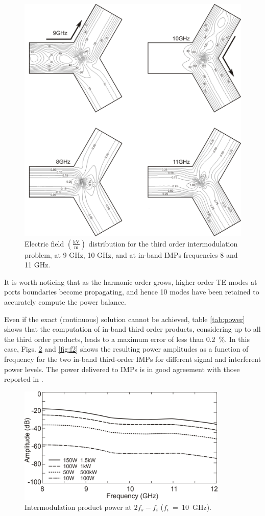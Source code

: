 \begin{figure}[!ht]
\centering
\includegraphics[width=13.4cm]{nlfield}
\caption{Electric field $\left(\frac{\mathrm{kV}}{\mathrm{m}}\right)$ distribution for the third order intermodulation problem, at 9 GHz, 10 GHz, and at in-band IMPs frequencies 8 and 11 GHz.}
\label{fig:nlfield}
\end{figure}

It is worth noticing that as the harmonic order grows, higher order TE modes at ports boundaries become propagating, and hence 10 modes \cite{pelosi2009quick} have been retained to accurately compute the power balance.


Even if the exact (continuous) solution cannot be achieved, table \ref{tab:power} shows that the computation of in-band third order products, considering up to all the third order products, leads to a maximum error of less than 0.2~\%. In this case, Figs. \ref{fig:f1} and \ref{fig:f2} shows the resulting power amplitudes as a function of frequency for the two in-band third-order IMPs for different signal and interferent power levels. The power delivered to IMPs is in good agreement with those reported in \cite{how1997nonlinear}.

\begin{figure}[!ht]
\centering
\includegraphics[width=10cm]{f1}
\caption{Intermodulation product power at $2 f_s - f_i$ ($f_i$~=~10~GHz).}
\label{fig:f1}
\end{figure}


